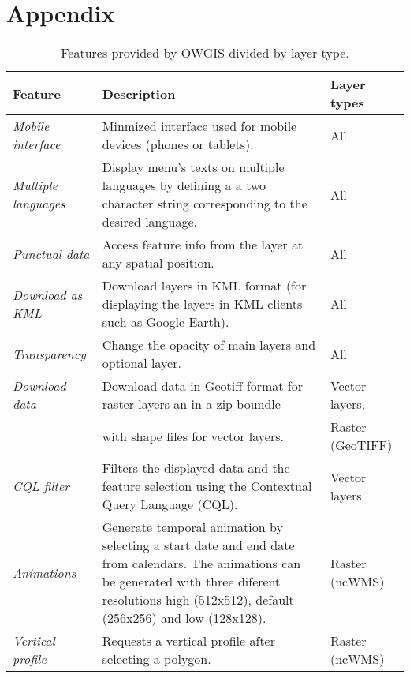 \appendix
\section*{Appendix}
\label{sec:app}

\begin{table*}[h]
     \centering
     \caption{Features provided by OWGIS divided by layer type. }
     \begin{tabularx}{460pt}{|l|X|l|}
         \hline
         \textbf{Feature} & \textbf{Description} & \textbf{Layer types} \\
         \hline
         \emph{Mobile interface} & Minmized interface used for mobile devices (phones or tablets). & All \\
         \hline
         \emph{Multiple languages} & Display menu's texts on multiple languages by defining a
                                a two character string corresponding to the desired language. & All \\
         \hline
         \emph{Punctual data} & Access feature info from the layer at any spatial 
         position. & All \\
         \hline
         \emph{Download as KML} & Download layers in KML format (for displaying the layers
            in KML clients such as Google Earth). & All \\  
         \hline
         \emph{Transparency} & Change the opacity of main layers and optional layer. & All \\  
         \hline
         \emph{Download data} & Download data in Geotiff format for raster layers an in a zip boundle
                   & Vector layers,  \\  
               &     with shape files for vector layers.& Raster (GeoTIFF)\\ 
         \hline
         \emph{CQL filter} & Filters the displayed data and the feature selection
             using the Contextual Query Language (CQL). & Vector layers \\  
         \hline
         \emph{Animations} & Generate temporal animation by selecting a start date and 
             end date from calendars. The animations can be generated 
             with three diferent resolutions high (512x512), default (256x256) and
             low (128x128). & Raster (ncWMS) \\  
         \hline
         \emph{Vertical profile} & Requests a vertical profile after selecting a 
             polygon. & Raster (ncWMS) \\   

\end{tabularx}
\end{table*}

